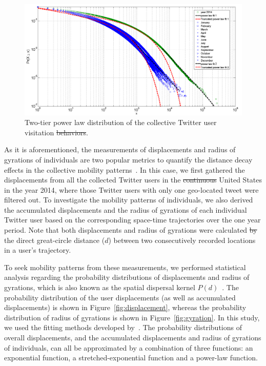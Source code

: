 \documentclass[ijgi,article,accept,moreauthors,pdftex,10pt,a4paper]{mdpi}
\theoremstyle{mdpi}
\newcounter{ex}
\newcounter{re}
\theoremstyle{mdpidefinition}
\providecommand{\DIFadd}[1]{{\protect\color{blue}\uwave{#1}}} %
\providecommand{\DIFdel}[1]{{\protect\color{red}\sout{#1}}}                      %
\providecommand{\DIFaddbegin}{} %
\providecommand{\DIFaddend}{} %
\providecommand{\DIFdelbegin}{} %
\providecommand{\DIFdelend}{} %
\providecommand{\DIFaddFL}[1]{\DIFadd{#1}} %
\providecommand{\DIFdelFL}[1]{\DIFdel{#1}} %
\providecommand{\DIFaddbeginFL}{} %
\providecommand{\DIFaddendFL}{} %
\providecommand{\DIFdelbeginFL}{} %
\providecommand{\DIFdelendFL}{} %
\begin{document}
\begin{figure}[ht]
\centering
\includegraphics[width=1.0\linewidth]{./figures/visitation}
\caption{Two-tier power law distribution of the collective Twitter user visitation \DIFdelbeginFL \DIFdelFL{behaviors}\DIFdelendFL \DIFaddbeginFL \DIFaddFL{behavior}\DIFaddendFL .}
\label{fig:visitation}
\end{figure}
\FloatBarrier

As it is aforementioned, the measurements of displacements and radius of gyrations of individuals are two popular metrics to quantify the distance decay effects in the collective mobility patterns~\cite{gonzalez2008understanding}.
In this case, we first gathered the displacements from all the collected Twitter users in the \DIFdelbegin \DIFdel{continuous }\DIFdelend \DIFaddbegin \DIFadd{conterminous }\DIFaddend United States in the year 2014, where those Twitter users with only one geo-located tweet were filtered out. 
To investigate the mobility patterns of individuals, we also derived the accumulated displacements and the radius of gyrations of each individual Twitter user based on the corresponding space-time trajectories over the one year period.
Note that both displacements and radius of gyrations were calculated \DIFdelbegin \DIFdel{by }\DIFdelend \DIFaddbegin \DIFadd{based on }\DIFaddend the direct great-circle distance ($d$) between two consecutively recorded locations in a user's trajectory.

To seek mobility patterns from these measurements, we performed statistical analysis regarding the probability distributions of displacements and radius of gyrations, which is also known as the spatial dispersal kernel $P(d)$~\cite{brockmann2006scaling}.
The probability distribution of the user displacements (as well as accumulated displacements) is shown in Figure~\ref{fig:displacement}, whereas the probability distribution of radius of gyrations is shown in Figure~\ref{fig:gyration}. 
In this study, we used the fitting methods developed by~\cite{Jurdak2015}.
The probability distributions of overall displacements, and the accumulated displacements and radius of gyrations of individuals, can all be approximated by a combination of three functions: an exponential function, a stretched-exponential function and a power-law function.
\end{document}

